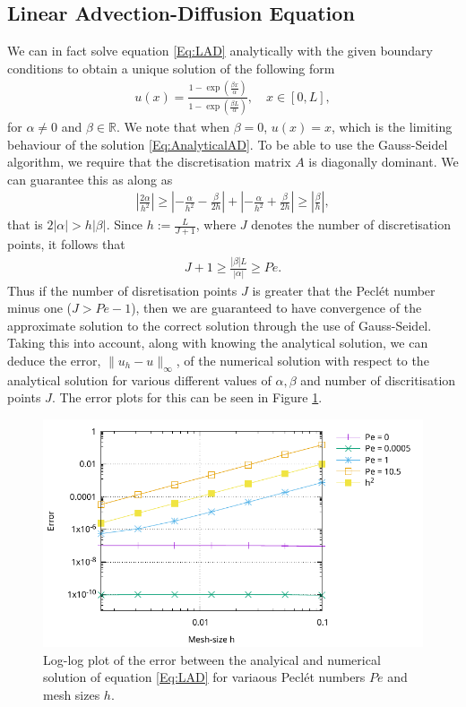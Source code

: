 \documentclass[a4paper,11pt]{article}
\theoremstyle{break}
\theoremstyle{break2}
\theoremstyle{break}
\theoremstyle{break2}
\newcommand{\R}{\mathbb{R}}
\begin{document}
\subsection{Linear Advection-Diffusion Equation}
We can in fact solve equation \eqref{Eq:LAD} analytically with the given boundary conditions to obtain a unique solution of the following form
\begin{align}\label{Eq:AnalyticalAD}
u(x) = \frac{1 - \exp\left(\frac{\beta x}{\alpha}\right)}{1 - \exp\left(\frac{\beta L}{\alpha}\right)}, \quad x \in [0,L],
\end{align}
for $ \alpha \neq 0 $ and $ \beta \in \R $. We note that when $ \beta = 0 $, $ u(x) = x $, which is the limiting behaviour of the solution \eqref{Eq:AnalyticalAD}.
To be able to use the Gauss-Seidel algorithm, we require that the discretisation matrix $ A $ is diagonally dominant. We can guarantee this as along as
\begin{align*}
\left|\frac{2\alpha}{h^2}\right| \geq \left|-\frac{\alpha}{h^2} - \frac{\beta}{2h}\right| + \left|-\frac{\alpha}{h^2} + \frac{\beta}{2h}\right| \geq \left|\frac{\beta}{h}\right|,
\end{align*}
that is $ 2|\alpha| > h|\beta| $. Since $ h := \frac{L}{J+1} $, where $ J $ denotes the number of discretisation points, it follows that
\begin{align*}
J+1 \geq \frac{|\beta|L}{|\alpha|} \geq Pe. 
\end{align*}
Thus if the number of disretisation points $ J $ is greater that the Pecl\'{e}t number minus one ($ J > Pe - 1 $), then we are guaranteed to have convergence of the approximate solution to the correct solution through the use of Gauss-Seidel. Taking this into account, along with knowing the analytical solution, we can deduce the error, $ \|u_h - u\|_{\infty} $, of the numerical solution with respect to the analytical solution for various different values of $ \alpha, \beta $ and number of discritisation points $ J $. The error plots for this can be seen in Figure \ref{Fig:ErrorLAD}.
\begin{figure}[h!]
	\centering
	\includegraphics{Error_plots.pdf}
	\caption{Log-log plot of the error between the analyical and numerical solution of equation \eqref{Eq:LAD} for variaous Pecl\'{e}t numbers $ Pe $ and mesh sizes $ h $. \label{Fig:ErrorLAD}}
\end{figure}
\end{document}

